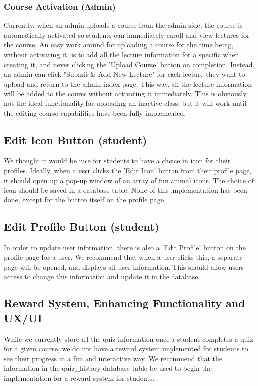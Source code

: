 \documentclass[12pt]{article}
\begin{document}
\subsubsection{Course Activation (Admin)}
Currently, when an admin uploads a course from the admin side, the course is automatically activated so students can immediately enroll and view lectures for the course. An easy work around for uploading a course for the time being, without activating it, is to add all the lecture information for a specific when creating it, and never clicking the 'Upload Course' button on completion. Instead, an admin can click "Submit \& Add New Lecture" for each lecture they want to upload and return to the admin index page. This way, all the lecture information will be added to the course without activating it immediately. This is obviously not the ideal functionality for uploading an inactive class, but it will work until the editing course capabilities have been fully implemented.
\subsection{Edit Icon Button (student)}
We thought it would be nice for students to have a choice in icon for their profiles. Ideally, when a user clicks the 'Edit Icon' button from their profile page, it should open up a pop-up window of an array of fun animal icons. The choice of icon should be saved in a database table. None of this implementation has been done, except for the button itself on the profile page.
\subsection{Edit Profile Button (student)}
In order to update user information, there is also a 'Edit Profile' button on the profile page for a user. We recommend that when a user clicks this, a separate page will be opened, and displays all user information. This should allow users access to change this information and update it in the database.
\subsection{Reward System, Enhancing Functionality and UX/UI}
While we currently store all the quiz information once a student completes a quiz for a given course, we do not have a reward system implemented for students to see their progress in a fun and interactive way. We recommend that the information in the quiz\_history database table be used to begin the implementation for a reward system for students.
\end{document}

